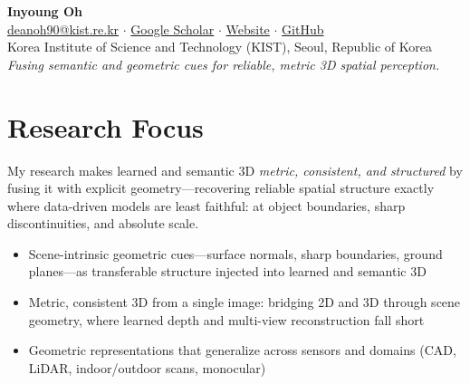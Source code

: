 \documentclass[10pt,a4paper]{article}
\begin{document}
	\pagestyle{empty}\thispagestyle{empty}
	
	\begin{center}
		{\LARGE \textbf{Inyoung Oh}}\\[1.4mm]
		\href{mailto:deanoh90@kist.re.kr}{deanoh90@kist.re.kr}
		\quad $\cdot$ \quad
		\href{https://scholar.google.co.kr/citations?hl=en&user=e3h5YtAAAAAJ&view_op=list_works&sortby=pubdate}{Google Scholar}
		\quad $\cdot$ \quad
		\href{https://inyoungoh-cde.github.io/}{Website}
		\quad $\cdot$ \quad
		\href{https://github.com/inyoungoh-cde}{GitHub}\\
		Korea Institute of Science and Technology (KIST), Seoul, Republic of Korea\\[1.0mm]
		\textit{Fusing semantic and geometric cues for reliable, metric 3D spatial perception.}
	\end{center}
	
	\section*{Research Focus}
	\noindent
	My research makes learned and semantic 3D \emph{metric, consistent, and structured} by fusing it with explicit geometry---recovering reliable spatial structure exactly where data-driven models are least faithful: at object boundaries, sharp discontinuities, and absolute scale.
	\begin{itemize}[leftmargin=1.8em]
		\item Scene-intrinsic geometric cues---surface normals, sharp boundaries, ground planes---as transferable structure injected into learned and semantic 3D
		\item Metric, consistent 3D from a single image: bridging 2D and 3D through scene geometry, where learned depth and multi-view reconstruction fall short
		\item Geometric representations that generalize across sensors and domains (CAD, LiDAR, indoor/outdoor scans, monocular)
	\end{itemize}
	
\end{document}
